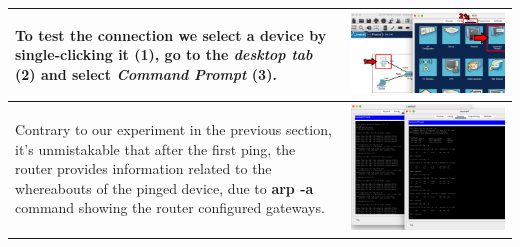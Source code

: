 \documentclass[11pt,a4paper]{report}
\begin{document}
\begin{flushleft}
\begin{center}
\begin{longtable}{ m{5cm} l }
                        To test the connection we select a device by \textbf{single-clicking} it (1), go to the \textit{desktop tab} (2) and select \textit{Command Prompt} (3).                                                                                                                                                                                                                                    & \includegraphics[scale=0.35 ,valign=c]{p1-connectingdevices/CiscoPacketTracer_cmdOutput}  \\ \hline
                        Contrary to our experiment in the previous section, it's unmistakable that after the first ping, the router provides information related to the whereabouts of the pinged device, due to \textbf{arp -a} command showing the router configured gateways.                                                                                                                                    & \includegraphics[scale=0.34 ,valign=c]{p2-connecting2lanswithrouter/Laptop0_cmdall}       \\ \hline

\end{longtable}
\end{center}
\end{flushleft}
\end{document}
